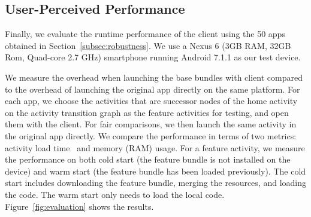 \subsection{User-Perceived Performance}


\begin{figure*}[!t]
   \centering
 \vspace{-1em}
  \caption{Runtime Performance}
  \vspace{-1em}
  \label{fig:evaluation}
\end{figure*}

Finally, we evaluate the runtime performance of the \nickName{} client using the 50 apps obtained in Section~\ref{subsec:robustness}. 
We use a Nexus 6 (3GB RAM, 32GB Rom, Quad-core 2.7 GHz) smartphone running Android 7.1.1 as our test device.

We measure the overhead when launching the base bundles with \nickName{} client compared to the overhead of launching the original app directly on the same platform. For each app, we choose the activities that are successor nodes of the home activity on the activity transition graph as the feature activities for testing, and open them with the \nickName{} client. For fair comparisons, we then launch the same activity in the original app directly. We compare the performance in terms of two metrics: activity load time~\cite{launch_time} and memory (RAM) usage. For a feature activity, we measure the performance on both cold start (the feature bundle is not installed on the device) and warm start (the feature bundle has been loaded previously). The cold start includes downloading the feature bundle, merging the resources, and loading the code. The warm start only needs to load the local code.  Figure~\ref{fig:evaluation} shows the results.


